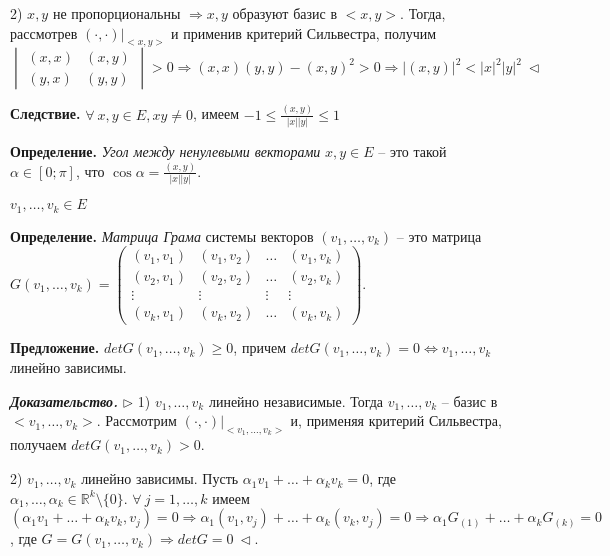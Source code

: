 2) $x, y$ не пропорциональны $\Rightarrow x, y$ образуют базис в $<x, y>$. Тогда, рассмотрев $(\cdot, \cdot)|_{<x, y>}$ и применив критерий Сильвестра, получим $\begin{vmatrix} (x,x) & (x,y) \\ (y,x) & (y,y) \end{vmatrix} > 0 \Rightarrow (x,x)(y,y) - (x,y)^2 > 0 \Rightarrow |(x, y)|^2 < |x|^2 |y|^2 \ \lhd$

\vspace{\baselineskip}
\textbf{Следствие.} $\forall \ x, y \in E, xy \neq 0$, имеем $-1 \leq \frac{(x,y)}{|x||y|} \leq 1$ 

\vspace{\baselineskip}
\textbf{Определение.} \textit{Угол между ненулевыми векторами} $x, y \in E$ -- это такой $\alpha \in [0; \pi]$, что $\cos \alpha = \frac{(x,y)}{|x||y|}$.

\vspace{\baselineskip}
$v_1, \dots, v_k \in E$

\textbf{Определение.} \textit{Матрица Грама} системы векторов $(v_1, \dots, v_k)$ -- это матрица $G(v_1, \dots, v_k) = \begin{pmatrix} (v_1, v_1) & (v_1, v_2) & \dots & (v_1, v_k) \\
(v_2, v_1) & (v_2, v_2) & \dots & (v_2, v_k) \\
\vdots & \vdots & \vdots & \vdots \\
(v_k, v_1) & (v_k, v_2) & \dots & (v_k, v_k) \end{pmatrix}$.

\vspace{\baselineskip}
\textbf{Предложение.} $detG(v_1, \dots, v_k) \geq 0$, причем $detG(v_1, \dots, v_k) = 0 \Leftrightarrow v_1, \dots, v_k$ линейно зависимы.

\vspace{\baselineskip}
\textbf{\textit{Доказательство.}} $\rhd$ 1) $v_1, \dots, v_k$ линейно независимые. Тогда $v_1, \dots, v_k$ -- базис в $<v_1, \dots, v_k>$. Рассмотрим $(\cdot, \cdot)|_{<v_1, \dots, v_k>}$ и, применяя критерий Сильвестра, получаем $detG(v_1, \dots, v_k) > 0$.

2) $v_1, \dots, v_k$ линейно зависимы. Пусть $\alpha_1 v_1 + \dots + \alpha_k v_k = 0$, где $\alpha_1, \dots, \alpha_k \in \mathbb{R}^k \setminus \{0\}$. $\forall \ j = 1, \dots, k$ имеем $(\alpha_1 v_1 + \dots + \alpha_k v_k, v_j) = 0 \Rightarrow \alpha_1 (v_1, v_j) + \dots + \alpha_k (v_k, v_j) = 0 \Rightarrow \alpha_1 G_{(1)} + \dots + \alpha_k G_{(k)} = 0$, где $G = G(v_1, \dots, v_k) \Rightarrow detG = 0 \ \lhd$.

